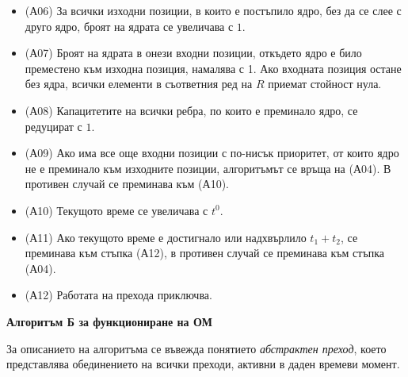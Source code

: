 \begin{itemize}
  \item (А06) За всички изходни позиции, в които е постъпило ядро, без да се слее с друго ядро, броят на ядрата се увеличава с $1$.

  \item (А07) Броят на ядрата в онези входни позиции, откъдето ядро е било преместено към изходна 
  позиция, намалява с 1. Ако входната позиция остане без ядра, всички елементи в съответния ред на $R$ приемат стойност нула.

  \item (А08) Капацитетите на всички ребра, по които е преминало ядро, се редуцират с $1$.

  \item (А09) Ако има все още входни позиции с по-нисък приоритет, от които ядро не е преминало 
  към изходните позиции, алгоритъмът се връща на (А04). В противен случай се преминава към (А10).

  \item (А10) Текущото време се увеличава с $t^0$.

  \item (А11) Ако текущото време е достигнало или надхвърлило $t_1 + t_2$, се преминава към стъпка (А12), в противен случай се преминава към стъпка (А04).

  \item (А12) Работата на прехода приключва.
\end{itemize}


\textbf{Алгоритъм Б за функциониране на ОМ}

За описанието на алгоритъма се въвежда понятието \emph{абстрактен преход}, което представлява обединението на всички преходи, активни в даден времеви момент.

